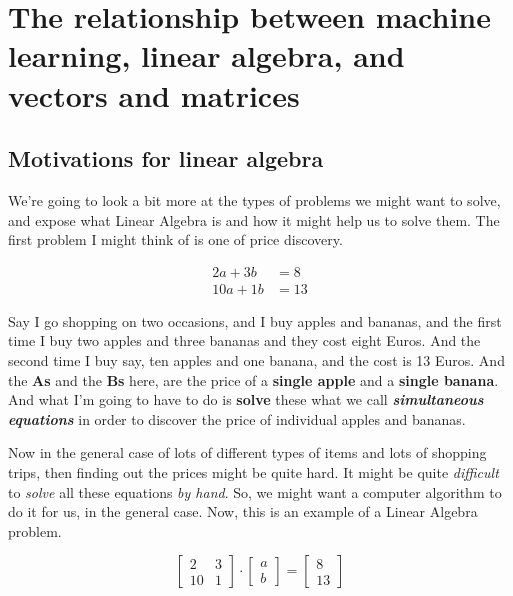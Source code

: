 \documentclass[]{article}
\begin{document}
\section{The relationship between machine learning, linear algebra, and vectors and matrices}

\subsection{Motivations for linear algebra}

We're going to look a bit more at the types of problems we might want to solve, and expose what Linear Algebra is and how it might help us to solve them.
The first problem I might think of is one of price discovery.

\begin{equation} \label{eq1}
\begin{split}
2a + 3b & = 8 \\
10a + 1b & = 13
\end{split}
\end{equation}

Say I go shopping on two occasions, and I buy apples and bananas, and the first time I buy two apples and three bananas and they cost eight Euros.
And the second time I buy say, ten apples and one banana, and the cost is 13 Euros.
And the \textbf{As} and the \textbf{Bs} here,
are the price of a \textbf{single apple} and a \textbf{single banana}.
And what I'm going to have to do is \textbf{solve} these what we call \textbf{\textit{simultaneous equations}} in order to discover the price of individual apples and bananas.

Now in the general case of lots of different types of items and lots of shopping trips, then finding out the prices might be quite hard. It might be quite \textit{difficult} to \textit{solve} all these equations \textit{by hand}. So, we might want a computer algorithm to do it for us, in the general case. Now, this is an example of a Linear Algebra problem.

\begin{equation} \label{eq2}
	\begin{bmatrix}
	2 & 3 \\
	10 & 1
	\end{bmatrix}
	\cdot
	\begin{bmatrix}
	a \\
	b
	\end{bmatrix}
	=
	\begin{bmatrix}
	8 \\
	13
	\end{bmatrix}
\end{equation}
\end{document}
